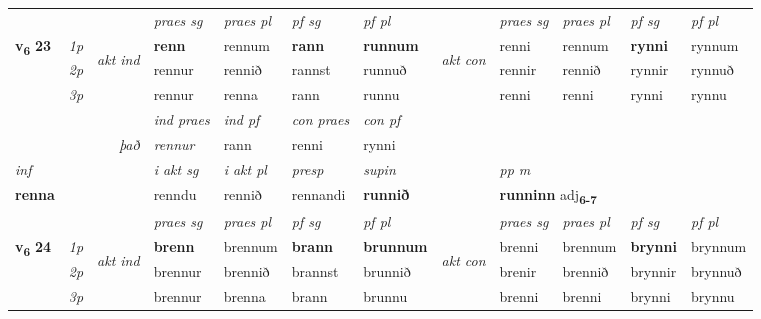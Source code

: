 \begin{longtable}[l]{X>{\footnotesize\itshape}llXXXXlXXXX}
\midrule

 & &   & \textit{praes sg}  & \textit{praes pl}    & \textit{ pf sg} & \textit{pf pl} & & \textit{praes sg}  & \textit{praes pl}    & \textit{pf sg} & \textit{pf pl }  \\ \cmidrule{4-7} \cmidrule{9-12}
 \multirow{2}{*}{{{\textbf{v{\textsubscript{6}}} \Large{\textbf{23}}}}}  & 1p & \multirow{3}{*}{\begin{turn}{90}\textit{akt ind}\end{turn}} & \textbf{renn} & rennum & \textbf{rann} & \textbf{runnum} & \multirow{3}{*}{\begin{turn}{90}\textit{akt con}\end{turn}} &renni & rennum & \textbf{rynni} & rynnum\\*
 & 2p &  &  rennur  & rennið & rannst & runnuð & & rennir & rennið & rynnir & rynnuð \\*
 & 3p &  & rennur & renna & rann & runnu & & renni & renni& rynni & rynnu \\*
\cmidrule{4-7} \cmidrule{9-12}

   && &  \textit{ind praes} & \textit{ind pf} & \textit{con praes} & \textit{con pf} \\*
\multicolumn{3}{r}{\textit{það}} & rennur & rann & renni & rynni \\*

\cmidrule{4-7}
   {\textit{inf}} & &  & \textit{i akt sg} & \textit{i akt pl}   & \textit{presp} & \textit{supin}  && \textit{pp m} \\*
  {\textbf{renna}} & && renndu  & rennið   & rennandi &  \textbf{runnið}  && \multicolumn{2}{l}{\textbf{runninn} adj\textbf{\textsubscript{6-7}}} \\*

\midrule

 & &   & \textit{praes sg}  & \textit{praes pl}    & \textit{ pf sg} & \textit{pf pl} & & \textit{praes sg}  & \textit{praes pl}    & \textit{pf sg} & \textit{pf pl }  \\ \cmidrule{4-7} \cmidrule{9-12}
 \multirow{2}{*}{{{\textbf{v{\textsubscript{6}}} \Large{\textbf{24}}}}}  & 1p & \multirow{3}{*}{\begin{turn}{90}\textit{akt ind}\end{turn}} & \textbf{brenn} & brennum & \textbf{brann} & \textbf{brunnum} & \multirow{3}{*}{\begin{turn}{90}\textit{akt con}\end{turn}} &brenni & brennum & \textbf{brynni} & brynnum\\*
 & 2p &  &  brennur  & brennið & brannst & brunnið & & brenir & brennið & brynnir & brynnuð \\*
 & 3p &  & brennur & brenna & brann & brunnu & & brenni & brenni& brynni & brynnu \\*
\cmidrule{4-7} \cmidrule{9-12}


\end{longtable}

